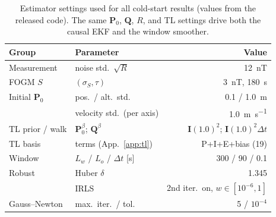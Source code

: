 \documentclass{IEEEtaes}
\begin{document}
\begin{table}[t]
\caption{Estimator settings used for all cold-start results (values from the
released code). The same $\mathbf{P}_0$, $\mathbf{Q}$, $R$, and TL settings drive
both the causal EKF and the window smoother.}
\label{tab:params}
\centering
\footnotesize
\setlength{\tabcolsep}{3pt}
\begin{tabular}{@{}llr@{}}
\toprule
Group & Parameter & Value \\
\midrule
Measurement & noise std.\ $\sqrt{R}$ & \SI{12}{\nano\tesla} \\
FOGM $S$ & $(\sigma_S,\tau)$ & \SI{3}{\nano\tesla}, \SI{180}{\second} \\
Initial $\mathbf{P}_0$ & pos.\ / alt.\ std. & \SI{0.1}{} / \SI{1.0}{\meter} \\
 & velocity std.\ (per axis) & \SI{1.0}{\meter\per\second} \\
TL prior / walk & $\mathbf{P}_0^{\beta}$;\; $\mathbf{Q}^{\beta}$ &
  $\mathbf{I}(1.0)^2$;\; $\mathbf{I}(1.0)^2\Delta t$ \\
TL basis & terms (App.~\ref{app:tl}) & P{+}I{+}E{+}bias (19) \\
Window & $L_w$ / $L_o$ / $\Delta t$ [s] & 300 / 90 / 0.1 \\
Robust & Huber $\delta$ & 1.345 \\
 & IRLS & 2nd iter.\ on, $w\in[10^{-6},1]$ \\
Gauss--Newton & max.\ iter.\ / tol. & 5 / $10^{-4}$ \\
\bottomrule
\end{tabular}
\end{table}
\end{document}
